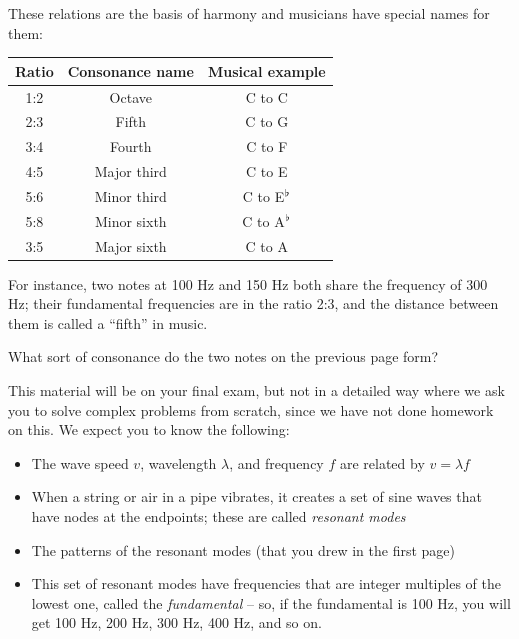 \documentclass[12pt]{article}
\begin{document}
These relations are the basis of harmony and musicians have special names for them:
\begin{center}
\large
	\begin{tabular}{|c|c|c|}
		\hline
		\bf Ratio & \bf Consonance name & \bf Musical example \\ \hline
		1:2   & Octave          & C to C          \\ \hline
		2:3   & Fifth           & C to G          \\ \hline
		3:4   & Fourth          & C to F          \\ \hline
		4:5   & Major third     & C to E          \\ \hline
		5:6   & Minor third     & C to E$\null^\flat$     \\ \hline
		5:8   & Minor sixth     & C to A$\null^\flat$     \\ \hline
		3:5   & Major sixth     & C to A          \\ \hline
	\end{tabular}

\normalsize
\end{center}
For instance, two notes at 100 Hz and 150 Hz both share the frequency of 300 Hz; their fundamental frequencies are in the ratio 2:3, and the distance between them is called a ``fifth'' in music.

What sort of consonance do the two notes on the previous page form? 

\vfill




\begin{center}
	
	\underline{\hspace{3in}}
	
	\vspace{1in}
	
	This material will be on your final exam, but not in a detailed way where we ask you to solve complex problems from scratch, since we have not done homework on this. We expect you to know the following:
	
	\begin{itemize}
		\item The wave speed $v$, wavelength $\lambda$, and frequency $f$ are related by $v = \lambda f$
		\item When a string or air in a pipe vibrates, it creates a set of sine waves that have nodes at the endpoints; these are called {\it resonant modes}
		\item The patterns of the resonant modes (that you drew in the first page)
		\item This set of resonant modes have frequencies that are integer multiples of the lowest one, called the {\it fundamental} -- so, if the fundamental is 100 Hz, you will get 100 Hz, 200 Hz, 300 Hz, 400 Hz, and so on.

	\end{itemize}
\end{center}

 
\end{document}
